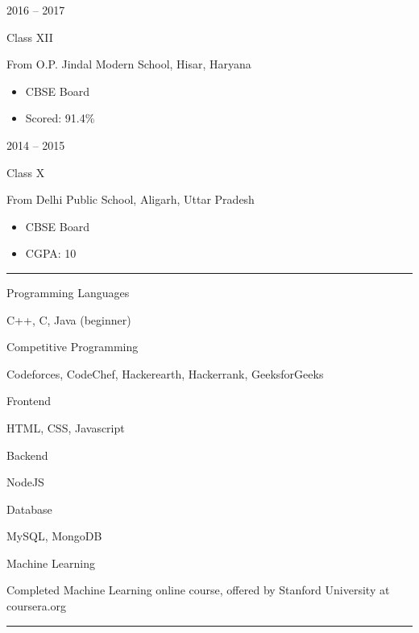 \documentclass[a4paper,10pt]{article}
\newlength{\cvcolumngapwidth}
\newlength{\cvleftcolumnwidth}
\newlength{\cvrightcolumnwidth}
\newcommand{\cvsectionstyle}[1]{{\normalsize\cvsectionfont\textcolor{cvsectioncolor}{#1}}}
\newcommand{\cvtitlestyle}[1]{{\large\cvtitlefont\textcolor{cvtitlecolor}{#1}}}
\newcommand{\cvdurationstyle}[1]{{\small\cvdurationfont\textcolor{cvdurationcolor}{#1}}}
\newcommand{\cvheadingstyle}[1]{{\normalsize\cvheadingfont\textcolor{cvheadingcolor}{#1}}}
\newlength{\cvafteritemskipamount}
\newlength{\cvaftersectionskipamount}
\newlength{\cvbetweensectionandheadingextraskipamount}
\newlength{\cvaftertitleskipamount}
\newlength{\cvparskip}
\newcommand{\cvsection}[1]{
    \begin{minipage}[t]{\cvleftcolumnwidth}
        \raggedleft\cvsectionstyle{#1}
    \end{minipage}%
    \hspace{\cvcolumngapwidth}%
    \begin{minipage}[t]{\cvrightcolumnwidth}
        \textcolor{cvrulecolor}{\rule{\cvrightcolumnwidth}{0.3mm}}
    \end{minipage}

    \vspace{\cvaftersectionskipamount}
}
\newcommand{\cvitem}[2]{
    \begin{minipage}[t]{\cvleftcolumnwidth}
        \raggedleft #1
    \end{minipage}%
    \hspace{\cvcolumngapwidth}%
    \begin{minipage}[t]{\cvrightcolumnwidth}
        \setlength{\parskip}{\cvparskip} #2
    \end{minipage}

    \vspace{\cvafteritemskipamount}
}
\newcommand{\cvtitle}[1]{
    \cvtitlestyle{#1}

    \vspace{\cvaftertitleskipamount}
    \vspace{-\cvparskip}
}
\begin{document}
\cvitem{
    \cvdurationstyle{2016 -- 2017}
}{
    \cvtitle{Class XII}

    From O.P. Jindal Modern School, Hisar, Haryana

    \begin{itemize}[leftmargin=*]
        \item CBSE Board
        \item Scored: 91.4\%
    \end{itemize}
}

\cvitem{
    \cvdurationstyle{2014 -- 2015}
}{
    \cvtitle{Class X}

    From Delhi Public School, Aligarh, Uttar Pradesh

    \begin{itemize}[leftmargin=*]
        \item CBSE Board
        \item CGPA: 10
    \end{itemize}
}



\cvsection{TECHNICAL SKILLS}

\vspace{\cvbetweensectionandheadingextraskipamount}

\cvitem{
    \cvheadingstyle{Programming Languages}
}{
    
    C++, C, Java (beginner)

}
\cvitem{
    \cvheadingstyle{Competitive Programming}
}{
  
    
   Codeforces, CodeChef, Hackerearth, Hackerrank, GeeksforGeeks
    
}

\cvitem{
    \cvheadingstyle{Frontend}
}{
   
    HTML, CSS, Javascript
    
}

\cvitem{
    \cvheadingstyle{Backend}
}{
   
    NodeJS
    
}

\cvitem{
    \cvheadingstyle{Database}
}{
    
   MySQL, MongoDB
    
}

\cvitem{
    \cvheadingstyle{Machine Learning}
}{
    
   Completed Machine Learning online course, offered by Stanford University at coursera.org
    
}

\cvsection{EXPERIENCE}
\end{document}

